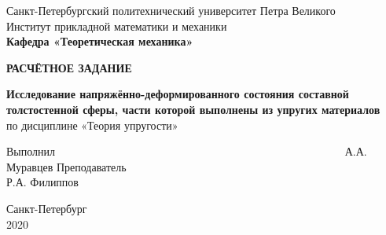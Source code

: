 \documentclass[a4paper,12pt]{article}	%
\begin{document}
\begin{titlepage}
    \begin{centering}Санкт-Петербургский политехнический университет Петра Великого\\
Институт прикладной математики и механики\\
 \textbf{ Кафедра «Теоретическая механика»}\\
\hfill\hrulefill\hrulefill\hfill
\end{centering}
\newline
\newline
\newline
\newline
\newline
\newline
\newline
\newline
\newline
\Large
\begin{centering}
{\textbf{РАСЧЁТНОЕ ЗАДАНИЕ}\\}
\end{centering}
\normalsize
\vfill
\begin{centering}\textbf{ Исследование напряжённо-деформированного состояния составной\\ толстостенной сферы, части которой выполнены из упругих материалов}\\
\normalfont по дисциплине «Теория упругости»\\
\end{centering}
\vfill
\vfill
\vfill
Выполнил
\,\,\,\,\,\,\,\,\,\,\,\,\,\,\,\,\,\,\,\,\,\,\,\,\,\,\,\,\,\,\,\,\,\,\,\,\,\,\,\,\,\,\,\,\,\,\,\,\,\,\,\,\,\,\,\,\,\,\,\,\,\,\,\,\,\,\,\,\,\,\,\,\,\,\,\,\,\,\,\,\,\,\,\,\,\,\,\,\,\,\,\,\,\,\,\,\,\,\,\,\,\,\,\,\,\,\,\,\,\,\,\,\,\,\,\,\,\,\,\,\,\,\,\,\,\,\,\,\,\,\,\,\,\,\,\,\,\,\,\,\,\,\,\,\,\,\,\,\,\,\,\,\,\, А.А. Муравцев
\vfill
Преподаватель\,\,\,\,\,\,\,\,\,\,\,\,\,\,\,\,\,\,\,\,\,\,\,\,\,\,\,\,\,\,\,\,\,\,\,\,\,\,\,\,\,\,\,\,\,\,\,\,\,\,\,\,\,\,\,\,\,\,\,\,\,\,\,\,\,\,\,\,\,\,\,\,\,\,\,\,\,\,\,\,\,\,\,\,\,\,\,\,\,\,\,\,\,\,\,\,\,\,\,\,\,\,\,\,\,\,\,\,\,\,\,\,\,\,\,\,\,\,\,\,\,\,\,\,\,\,\,\,\,\,\,\,\,\,\,\,\,\,\,\,\,\,\, Р.А. Филиппов
\vfill
\vfill
\vfill
\begin{centering}Санкт-Петербург\\
2020\\
\end{centering}
\end{titlepage}

\begin{centering}
{
  \hypersetup{linkcolor=black}
  \tableofcontents
}
\end{centering}
\newpage
\end{document}
